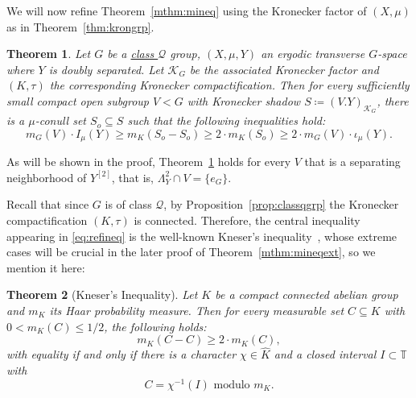 \documentclass{amsart}
\numberwithin{equation}{subsection}
\newtheorem{thm}{Theorem}[section]
\theoremstyle{remark}
\begin{document}
We will now refine Theorem~\ref{mthm:mineq} using the Kronecker factor of \(\left(X,\mu\right)\) as in Theorem~\ref{thm:krongrp}.

\begin{thm}\label{thm:mineq}
Let \(G\) be a \hyperlink{classQ}{class \(\mathcal{Q}\)} group, \(\left(X,\mu,Y\right)\) an ergodic transverse \(G\)-space where \(Y\) is doubly separated. Let \(\mathcal{K}_{G}\) be the associated Kronecker factor and \(\left(K,\tau\right)\) the corresponding Kronecker compactification. Then for every sufficiently small compact open subgroup \(V<G\) with Kronecker shadow \(S\coloneqq\left(V.Y\right)_{\mathcal{K}_{G}}\), there is a \(\mu\)-conull set \(S_{o}\subseteq S\) such that the following inequalities hold:
\begin{equation}\label{eq:refineq}
m_{G}\left(V\right)\cdot I_{\mu}\left(Y\right)\geq m_{K}\left(S_{o}-S_{o}\right)\geq2\cdot m_{K}\left(S_{o}\right)\geq 2\cdot m_{G}\left(V\right)\cdot\iota_{\mu}\left(Y\right).
\end{equation}
\end{thm}

As will be shown in the proof, Theorem~\ref{thm:mineq} holds for every \(V\) that is a separating neighborhood of \(Y^{\left[2\right]}\), that is, \(\Lambda_{Y}^{2}\cap V=\{e_{G}\}\).

Recall that since \(G\) is of class \(\mathcal{Q}\), by Proposition~\ref{prop:classqgrp} the Kronecker compactification \(\left(K,\tau\right)\) is connected. Therefore, the central inequality appearing in \eqref{eq:refineq} is the well-known Kneser's inequality~\cite[Satz (2)]{Kneser}, whose extreme cases will be crucial in the later proof of Theorem~\ref{mthm:mineqext}, so we mention it here:

\begin{thm}[Kneser's Inequality]\label{thm:kneser}
Let \(K\) be a compact connected abelian group and \(m_{K}\) its Haar probability measure. Then for every measurable set \(C\subseteq K\) with \(0<m_{K}\left(C\right)\leq1/2\), the following holds:
\[m_{K}\left(C-C\right)\geq 2\cdot m_{K}\left(C\right),\]
with equality if and only if there is a character \(\chi\in\widehat{K}\) and a closed interval \(I\subset\mathbb{T}\) with
\[C=\chi^{-1}\left(I\right)\text{ modulo }m_{K}.\]
\end{thm}
\end{document}
